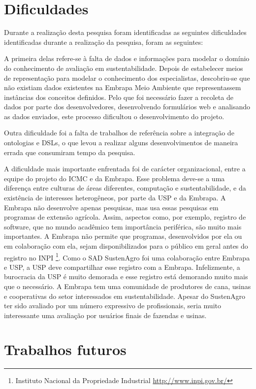 \section{Dificuldades }

Durante a realização desta pesquisa foram identificadas as seguintes
dificuldades identificadas durante a realização da pesquisa, foram
as seguintes:

A primeira delas refere-se à falta de dados e informações para modelar
o domínio do conhecimento de avaliação em sustentabilidade. Depois
de estabelecer meios de representação para modelar o conhecimento
dos especialistas, descobriu-se que não existiam dados existentes
na Embrapa Meio Ambiente que representassem instâncias dos conceitos
definidos. Pelo que foi necessário fazer a recoleta de dados por parte
dos desenvolvedores, desenvolvendo formulários web e analisando as
dados enviados, este processo dificultou o desenvolvimento do projeto.

Outra dificuldade foi a falta de trabalhos de referência sobre a integração
de ontologias e DSLs,  o que levou a realizar alguns desenvolvimentos
de maneira errada que consumiram tempo da pesquisa. 

A dificuldade mais importante enfrentada foi de carácter organizacional,
entre a equipe do projeto do ICMC e da Embrapa. Esse problema deve-se
a uma diferença entre culturas de áreas diferentes, computação e sustentabilidade,
e da existência de interesses heterogêneos, por parte da USP e da
Embrapa. A Embrapa não desenvolve apenas pesquisas, mas usa essas
pesquisas em programas de extensão agrícola. Assim, aspectos como,
por exemplo, registro de software, que no mundo acadêmico tem importância
periférica, são muito mais importantes. A Embrapa não permite que
programas, desenvolvidos por ela ou em colaboração com ela, sejam
disponibilizados para o público em geral antes do registro no INPI
\footnote{Instituto Nacional da Propriedade Industrial \url{http://www.inpi.gov.br/}}.
Como o SAD SustenAgro foi uma colaboração entre Embrapa e USP, a USP
deve compartilhar esse registro com a Embrapa. Infelizmente, a burocracia
da USP é muito demorada e esse registro está demorando muito mais
que o necessário. A Embrapa tem uma comunidade de produtores de cana,
usinas e cooperativas do setor interessados em sustentabilidade. Apesar
do SustenAgro ter sido avaliado por um número expressivo de profissionais,
seria muito interessante uma avaliação por usuários finais de fazendas
e usinas.

\section{Trabalhos futuros}

